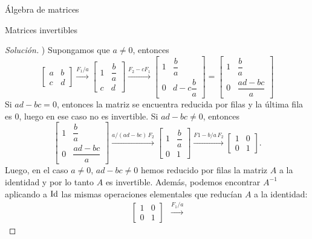 \begin{chapter}{\'Algebra de matrices}
\begin{section}{Matrices invertibles}
\begin{proof}[Solución]
                ) Supongamos que  $a\not=0$, entonces 
                \begin{equation*}
                \begin{bmatrix}a&b\\c&d\end{bmatrix} \stackrel{F_1/a}{\longrightarrow}
                \begin{bmatrix}1&\dfrac{b}{a}\\[6pt]c&d\end{bmatrix} \stackrel{F_2 -cF_1}{\longrightarrow}
                \begin{bmatrix}1&\dfrac{b}{a}\\[6pt]0&d- c\dfrac{b}{a}\end{bmatrix} =
                \begin{bmatrix}1&\dfrac{b}{a}\\[6pt]0&\dfrac{ad-bc}{a}\end{bmatrix}
                \end{equation*}   
                Si $ad-bc=0$,  entonces la matriz se encuentra reducida por filas y la última fila es $0$, luego en ese caso no es invertible.  Si $ad-bc\not=0$, entonces
                \begin{equation*}
                \begin{bmatrix}1&\dfrac{b}{a}\\[8pt]0&\dfrac{ad-bc}{a}\end{bmatrix} \stackrel{a/(ad-bc)\,F_2}{\longrightarrow}
                \begin{bmatrix}1&\dfrac{b}{a}\\[6pt]0&1\end{bmatrix}
                \stackrel{F1-b/a\,F_2}{\longrightarrow}
                \begin{bmatrix}1&0\\0&1\end{bmatrix}.
                \end{equation*} 
                Luego, en el caso $a\not=0$, $ad-bc\not=0$ hemos reducido por filas la matriz $A$  a la identidad y por lo tanto $A$  es invertible. Además, podemos encontrar $A^{-1}$ aplicando a $\operatorname{Id}$ las mismas operaciones elementales que reducían $A$ a la identidad:
                \begin{align*}
                \begin{bmatrix}1&0\\0&1\end{bmatrix} 
                &\stackrel{F_1/a}{\longrightarrow}

\end{align*}
\end{proof}
\end{section}
\end{chapter}
